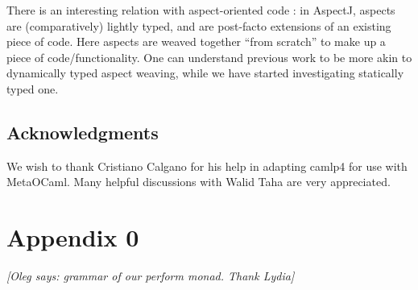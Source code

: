 \documentclass[draft]{elsart}
\newcommand{\oleg}[1]{{\it [Oleg says: #1]}}
\begin{document}
There is an interesting relation with aspect-oriented code
\cite{kiczales97aspectoriented}: in AspectJ, 
aspects are (comparatively) lightly typed, and are post-facto extensions of an
existing piece of code.  Here aspects are weaved together ``from scratch'' to
make up a piece of code/functionality.  One can understand previous work to be
more akin to dynamically typed aspect weaving, while we have started
investigating statically typed one.

\subsection*{Acknowledgments}
We wish to thank Cristiano Calgano for his help in adapting camlp4 for
use with MetaOCaml. Many helpful discussions with Walid Taha are very
appreciated. 




\section{Appendix 0}
\oleg{grammar of our perform monad. Thank Lydia}
\end{document}
